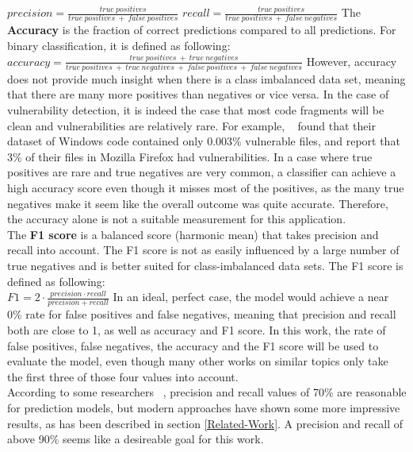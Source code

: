 \documentclass[
	a4paper,
	pagesize,
	pdftex,
	12pt,
	twoside, %
	BCOR=5mm, %
	ngerman,
	fleqn,
	final,
	]{scrartcl}
\begin{document}
\mbox{}\newline
$precision = \frac{true~positives}{true~positives~+~false~positives}$\newline
\mbox{}\newline
$recall = \frac{true~positives}{true~positives~+~false~negatives}$\newline
\mbox{}\newline
The \textbf{Accuracy} is the fraction of correct predictions compared to all predictions. For binary classification, it is defined as following:  \newline
\mbox{}\newline
$accuracy = \frac{true~positives~+~true~negatives}{true~positives~+~true~negatives~+~false~positives~+~false~negatives}$\newline
\mbox{}\newline
However, accuracy does not provide much insight when there is a class imbalanced data set, meaning that there are many more positives than negatives or vice versa. In the case of vulnerability detection, it is indeed the case that most code fragments will be clean and vulnerabilities are relatively rare. For example, ~\cite{Morrison.2015} found that their dataset of Windows code contained only 0.003\% vulnerable files, and \cite{Shin.2010} report that 3\% of their files in Mozilla Firefox had vulnerabilities. In a case where true positives are rare and true negatives are very common, a classifier can achieve a high accuracy score even though it misses most of the positives, as the many true negatives make it seem like the overall outcome was quite accurate. Therefore, the accuracy alone is not a suitable measurement for this application.\\
The \textbf{F1 score} is a balanced score (harmonic mean) that takes precision and recall into account. The F1 score is not as easily influenced by a large number of true negatives and is better suited for class-imbalanced data sets. The F1 score is defined as following:\\
\mbox{}\newline
$F1 = 2 \cdot \frac{precision \cdot recall}{precision + recall}$
\mbox{}\newline
In an ideal, perfect case, the model would achieve a near 0\% rate for false positives and false negatives, meaning that precision and recall both are close to 1, as well as accuracy and F1 score. In this work, the rate of false positives, false negatives, the accuracy and the F1 score will be used to evaluate the model, even though many other works on similar topics only take the first three of those four values into account.\\
According to some researchers ~\cite{Morrison.2015,Shin.2013,Neuhaus.2007}, precision and recall values of 70\% are reasonable for prediction models, but modern approaches have shown some more impressive results, as has been described in section \ref{Related-Work}. A precision and recall of above 90\% seems like a desireable goal for this work.
\end{document}
